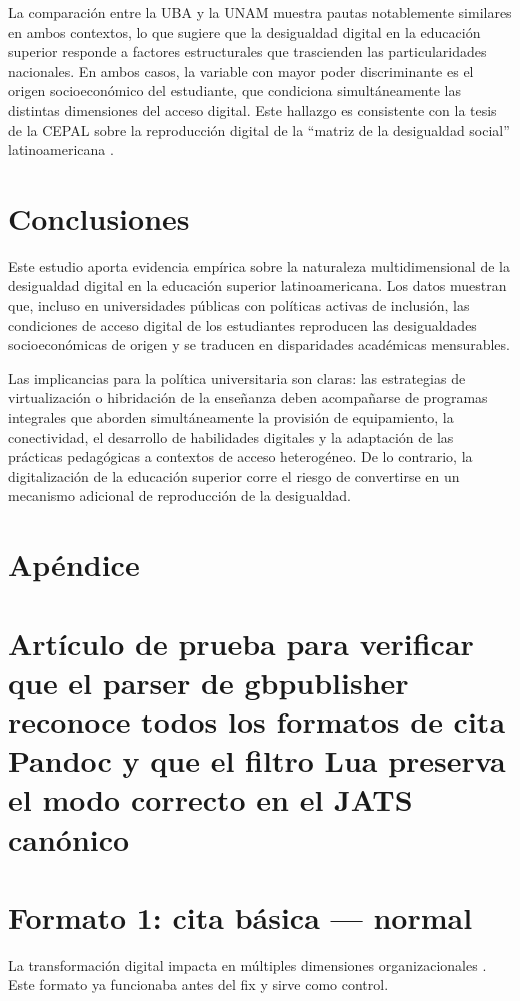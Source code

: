 \documentclass{article}
\begin{document}
La comparación entre la UBA y la UNAM muestra pautas notablemente similares en ambos contextos, lo que sugiere que la desigualdad digital en la educación superior responde a factores estructurales que trascienden las particularidades nacionales. En ambos casos, la variable con mayor poder discriminante es el origen socioeconómico del estudiante, que condiciona simultáneamente las distintas dimensiones del acceso digital. Este hallazgo es consistente con la tesis de la CEPAL sobre la reproducción digital de la “matriz de la desigualdad social” latinoamericana \autocite{2566-CEPAL2021}.


\section{Conclusiones}
Este estudio aporta evidencia empírica sobre la naturaleza multidimensional de la desigualdad digital en la educación superior latinoamericana. Los datos muestran que, incluso en universidades públicas con políticas activas de inclusión, las condiciones de acceso digital de los estudiantes reproducen las desigualdades socioeconómicas de origen y se traducen en disparidades académicas mensurables.

Las implicancias para la política universitaria son claras: las estrategias de virtualización o hibridación de la enseñanza deben acompañarse de programas integrales que aborden simultáneamente la provisión de equipamiento, la conectividad, el desarrollo de habilidades digitales y la adaptación de las prácticas pedagógicas a contextos de acceso heterogéneo. De lo contrario, la digitalización de la educación superior corre el riesgo de convertirse en un mecanismo adicional de reproducción de la desigualdad.


\section{Apéndice}

\section{Artículo de prueba para verificar que el parser de gbpublisher reconoce todos los formatos de cita Pandoc y que el filtro Lua preserva el modo correcto en el JATS canónico}

\section{Formato 1: cita básica — normal}
La transformación digital impacta en múltiples dimensiones organizacionales \autocite{2564-VANDEURSEN2019}. Este formato ya funcionaba antes del fix y sirve como control.
\end{document}
